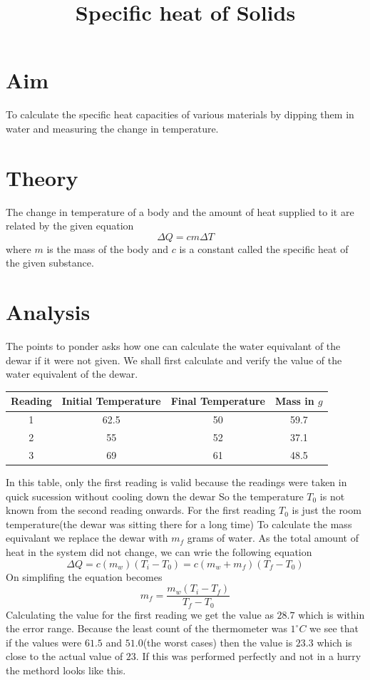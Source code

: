 \documentclass[12pt]{article}
\begin{document}
\author{}
\date{}
\title{Specific heat of Solids}
\maketitle

\section*{Aim}
To calculate the specific heat capacities of various materials by dipping them in water and measuring the change in temperature.

\section*{Theory}
The change in temperature of a body and the amount of heat supplied to it are related by the given equation
\[\Delta Q = cm\Delta T\]
where $m$ is the mass of the body and $c$ is a constant called the specific heat of the given substance.

\section*{Analysis}
The points to ponder asks how one can calculate the water equivalant of the dewar if it were not given.
We shall first calculate and verify the value of the water equivalent of the dewar.
\begin{table}[!ht]
    \centering
    \begin{tabular}{|c|c|c|c|}
    \hline
        Reading & Initial Temperature & Final Temperature & Mass in $g$ \\ \hline
        1 & 62.5 & 50 & 59.7 \\ \hline
        2 & 55 & 52 & 37.1 \\ \hline
        3 & 69 & 61 & 48.5 \\ \hline
    \end{tabular}
\end{table}

In this table, only the first reading is valid because the readings were taken in quick sucession without cooling down the dewar
So the temperature $T_0$ is not known from the second reading onwards.
For the first reading $T_0$ is just the room temperature(the dewar was sitting there for a long time)
To calculate the mass equivalant we replace the dewar with $m_f$ grams of water.
As the total amount of heat in the system did not change, we can wrie the following equation
\[\Delta Q = c(m_w)(T_i-T_0) = c(m_w+m_f)(T_f-T_0)\]
On simplifing the equation becomes
\[m_f = \frac{m_w(T_i-T_f)}{T_f-T_0}\]
Calculating the value for the first reading we get the value as $28.7$ which is within the error range.
Because the least count of the thermometer was $1^\circ C $ we see that if the values were $61.5$ and $51.0$(the worst cases) then the value is $23.3$ which is close to the actual value of $23$.
If this was performed perfectly and not in a hurry the methord looks like this.
\end{document}

